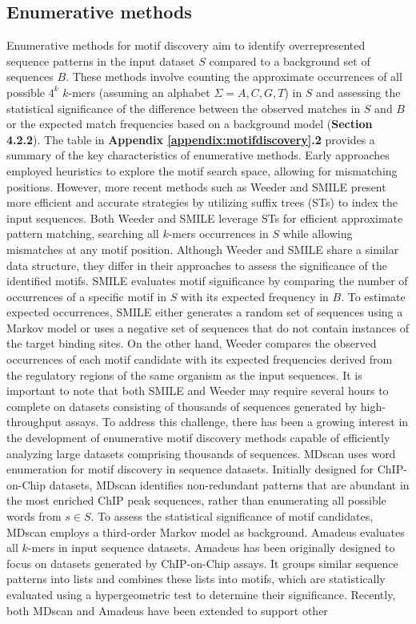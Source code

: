 \documentclass[a4paper, titlepage, openright]{book}
\begin{document}
\subsection{Enumerative methods}\label{subsection:enumerative-methods-appendix}
Enumerative methods for motif discovery aim to identify overrepresented sequence patterns in the input dataset $S$ compared to a background set of sequences $B$. These methods involve counting the approximate occurrences of all possible $4^{k}$ $k$-mers (assuming an alphabet $\Sigma={A,C,G,T}$) in $S$ and assessing the statistical significance of the difference between the observed matches in $S$ and $B$ or the expected match frequencies based on a background model (\textbf{Section 4.2.2}). The table in \textbf{Appendix \ref{appendix:motifdiscovery}.2} provides a summary of the key characteristics of enumerative methods. Early approaches employed heuristics to explore the motif search space, allowing for mismatching positions. However, more recent methods such as Weeder \citep{pavesi2001algorithm,pavesi2004weeder} and SMILE \citep{marsan2000algorithms} present more efficient and accurate strategies by utilizing suffix trees (STs) to index the input sequences. Both Weeder and SMILE leverage STs for efficient approximate pattern matching, searching all $k$-mers occurrences in $S$ while allowing mismatches at any motif position. Although Weeder and SMILE share a similar data structure, they differ in their approaches to assess the significance of the identified motifs. SMILE evaluates motif significance by comparing the number of occurrences of a specific motif in $S$ with its expected frequency in $B$. To estimate expected occurrences, SMILE either generates a random set of sequences using a Markov model or uses a negative set of sequences that do not contain instances of the target binding sites. On the other hand, Weeder compares the observed occurrences of each motif candidate with its expected frequencies derived from the regulatory regions of the same organism as the input sequences. It is important to note that both SMILE and Weeder may require several hours to complete on datasets consisting of thousands of sequences generated by high-throughput assays. To address this challenge, there has been a growing interest in the development of enumerative motif discovery methods capable of efficiently analyzing large datasets comprising thousands of sequences. MDscan \citep{liu2002algorithm} uses word enumeration for motif discovery in sequence datasets. Initially designed for ChIP-on-Chip datasets, MDscan identifies non-redundant patterns that are abundant in the most enriched ChIP peak sequences, rather than enumerating all possible words from $s \in S$. To assess the statistical significance of motif candidates, MDscan employs a third-order Markov model as background. Amadeus \citep{linhart2008transcription} evaluates all $k$-mers in input sequence datasets. Amadeus has been originally designed to focus on datasets generated by ChIP-on-Chip assays. It groups similar sequence patterns into lists and combines these lists into motifs, which are statistically evaluated using a hypergeometric test to determine their significance. Recently, both MDscan and Amadeus have been extended to support other 
\end{document}
